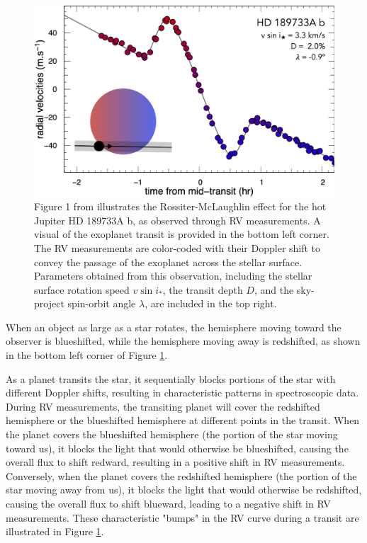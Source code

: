 \documentclass[oneside,12pt]{amsart}
\numberwithin{page}{section}
\begin{document}
\begin{figure}[htbp]
    \centering
    \includegraphics[width=0.7\linewidth]{figs/triaud_fig1.png}
    \caption{Figure 1 from \citep{triaud2017rossiter} illustrates the Rossiter-McLaughlin effect for the hot Jupiter HD 189733A b, as observed through RV measurements. A visual of the exoplanet transit is provided in the bottom left corner. The RV measurements are color-coded with their Doppler shift to convey the passage of the exoplanet across the stellar surface. Parameters obtained from this observation, including the stellar surface rotation speed $v \sin i_*$, the transit depth $D$, and the sky-project spin-orbit angle $\lambda$, are included in the top right.}
    \label{fig:triaud-fig1}
\end{figure}

When an object as large as a star rotates, the hemisphere moving toward the observer is blueshifted, while the hemisphere moving away is redshifted, as shown in the bottom left corner of Figure \ref{fig:triaud-fig1}. 

As a planet transits the star, it sequentially blocks portions of the star with different Doppler shifts, resulting in characteristic patterns in spectroscopic data. During RV measurements, the transiting planet will cover the redshifted hemisphere or the blueshifted hemisphere at different points in the transit. When the planet covers the blueshifted hemisphere (the portion of the star moving toward us), it blocks the light that would otherwise be blueshifted, causing the overall flux to shift redward, resulting in a positive shift in RV measurements. Conversely, when the planet covers the redshifted hemisphere (the portion of the star moving away from us), it blocks the light that would otherwise be redshifted, causing the overall flux to shift blueward, leading to a negative shift in RV measurements. These characteristic "bumps" in the RV curve during a transit are illustrated in Figure \ref{fig:triaud-fig1}.
\end{document}
